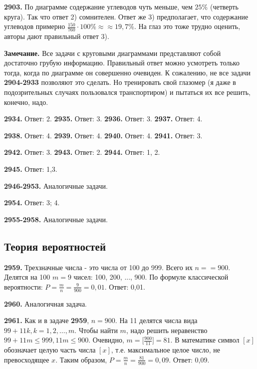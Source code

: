 \textbf{2903.} По диаграмме содержание углеводов чуть меньше, чем $25\%$ (четверть круга). Так что ответ 2) сомнителен. Ответ же 3) предполагает, что содержание углеводов примерно $\frac{150}{760}\cdot100\%\approx$\newline$\approx19,7\%$. На глаз это тоже трудно оценить, авторы дают правильный ответ 3).

\textbf{Замечание.} Все задачи с круговыми диаграммами представляют собой достаточно грубую информацию. Правильный ответ можно усмотреть только тогда, когда по диаграмме он совершенно очевиден. К сожалению, не все задачи \textbf{2904-2933} позволяют это сделать. Но тренировать свой глазомер (я даже в подозрительных случаях пользовался транспортиром) и пытаться их все решить, конечно, надо.

\textbf{2934.} Ответ: 2. \textbf{2935.} Ответ: 3. \textbf{2936.} Ответ: 3. \textbf{2937.} Ответ: 4.

\textbf{2938.} Ответ: 4. \textbf{2939.} Ответ: 4. \textbf{2940.} Ответ: 4. \textbf{2941.} Ответ: 3.

 \textbf{2942.} Ответ: 3. \textbf{2943.} Ответ: 2. \textbf{2944.} Ответ: 1, 2.

\textbf{2945.} Ответ: 1,3. 

\textbf{2946-2953.} Аналогичные задачи.

\textbf{2954.} Ответ: 3; 4.

\textbf{2955-2958.} Аналогичные задачи.

\subsection{Теория вероятностей}

\textbf{2959.} Трехзначные числа - это числа от 100 до 999. Всего их $n=$\newline$=900.$ Делятся на 100 $m=9$ чисел: 100, 200, ..., 900. По формуле классической вероятности: $P=\frac{m}{n}=\frac{9}{900}=0,01.$ \newline \null \hspace*{\fill} Ответ: 0,01. 

\textbf{2960.} Аналогичная задача.

\textbf{2961.} Как и в задаче \textbf{2959}, $n=900$. На 11 делятся числа вида $99+11k, k=1, 2, \dots, m.$ Чтобы найти $m$, надо решить неравенство $99+11m\leq999, 11m\leq900.$ Очевидно, $m=\bigg[\frac{900}{11}\bigg]=81.$ В математике символ $[x]$ обозначает целую часть числа $[x]$, т.е. максимальное целое число, не превосходящее $x$. Таким образом, $P = \frac{m}{n}=\frac{81}{900}=0,09.$ \newline \null \hspace*{\fill} Ответ: 0,09. 

